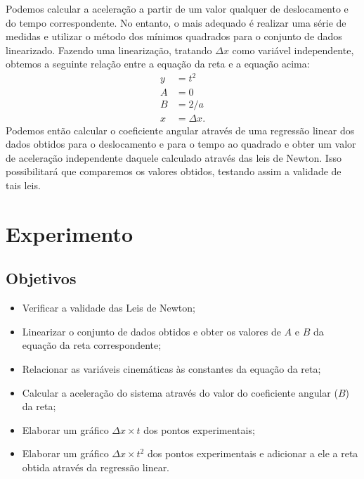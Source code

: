 Podemos calcular a aceleração a partir de um valor qualquer de deslocamento e do tempo correspondente. No entanto, o mais adequado é realizar uma série de medidas e utilizar o método dos mínimos quadrados para o conjunto de dados linearizado. Fazendo uma linearização, tratando $\Delta x$ como variável independente, obtemos a seguinte relação entre a equação da reta e a equação acima:
\begin{align}
	y &= t^2 \\
	A &= 0 \\
	B &= 2/a \\
	x &= \Delta x.
\end{align}
%
Podemos então calcular o coeficiente angular através de uma regressão linear dos dados obtidos para o deslocamento e para o tempo ao quadrado e obter um valor de aceleração independente daquele calculado através das leis de Newton. Isso possibilitará que comparemos os valores obtidos, testando assim a validade de tais leis.

\section{Experimento}

\subsection{Objetivos}

\begin{itemize}
     \item Verificar a validade das Leis de Newton;
	 \item Linearizar o conjunto de dados obtidos e obter os valores de $A$ e $B$ da equação da reta correspondente;
	 \item Relacionar as variáveis cinemáticas às constantes da equação da reta;
     \item Calcular a aceleração do sistema através do valor do coeficiente angular ($B$) da reta;
     \item Elaborar um gráfico $\Delta x \times t$ dos pontos experimentais;
	 \item Elaborar um gráfico $\Delta x \times t^2$ dos pontos experimentais e adicionar a ele a reta obtida através da regressão linear.
\end{itemize}

